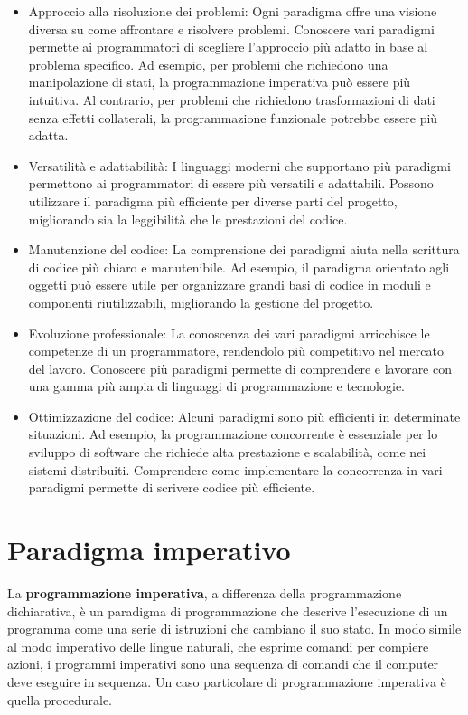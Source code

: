 \documentclass[
  letterpaper,
]{scrbook}
\begin{document}
\begin{itemize}
\item
  Approccio alla risoluzione dei problemi: Ogni paradigma offre una
  visione diversa su come affrontare e risolvere problemi. Conoscere
  vari paradigmi permette ai programmatori di scegliere l'approccio più
  adatto in base al problema specifico. Ad esempio, per problemi che
  richiedono una manipolazione di stati, la programmazione imperativa
  può essere più intuitiva. Al contrario, per problemi che richiedono
  trasformazioni di dati senza effetti collaterali, la programmazione
  funzionale potrebbe essere più adatta.
\item
  Versatilità e adattabilità: I linguaggi moderni che supportano più
  paradigmi permettono ai programmatori di essere più versatili e
  adattabili. Possono utilizzare il paradigma più efficiente per diverse
  parti del progetto, migliorando sia la leggibilità che le prestazioni
  del codice.
\item
  Manutenzione del codice: La comprensione dei paradigmi aiuta nella
  scrittura di codice più chiaro e manutenibile. Ad esempio, il
  paradigma orientato agli oggetti può essere utile per organizzare
  grandi basi di codice in moduli e componenti riutilizzabili,
  migliorando la gestione del progetto.
\item
  Evoluzione professionale: La conoscenza dei vari paradigmi arricchisce
  le competenze di un programmatore, rendendolo più competitivo nel
  mercato del lavoro. Conoscere più paradigmi permette di comprendere e
  lavorare con una gamma più ampia di linguaggi di programmazione e
  tecnologie.
\item
  Ottimizzazione del codice: Alcuni paradigmi sono più efficienti in
  determinate situazioni. Ad esempio, la programmazione concorrente è
  essenziale per lo sviluppo di software che richiede alta prestazione e
  scalabilità, come nei sistemi distribuiti. Comprendere come
  implementare la concorrenza in vari paradigmi permette di scrivere
  codice più efficiente.
\end{itemize}

\section{Paradigma imperativo}\label{paradigma-imperativo}

La \textbf{programmazione imperativa}, a differenza della programmazione
dichiarativa, è un paradigma di programmazione che descrive l'esecuzione
di un programma come una serie di istruzioni che cambiano il suo stato.
In modo simile al modo imperativo delle lingue naturali, che esprime
comandi per compiere azioni, i programmi imperativi sono una sequenza di
comandi che il computer deve eseguire in sequenza. Un caso particolare
di programmazione imperativa è quella procedurale.
\end{document}
